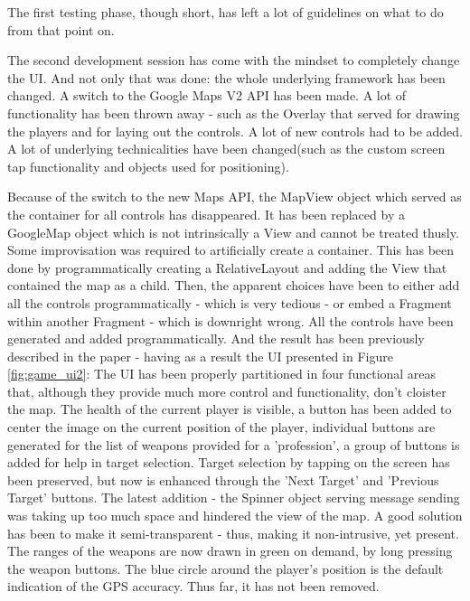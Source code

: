 \documentclass{article}
\begin{document}
The first testing phase, though short, has left a lot of guidelines on what to
do from that point on.\newline

The second development session has come with the mindset to completely change
the UI. And not only that was done: the whole underlying framework has been
changed. A switch to the Google Maps V2 API has been made. A lot of
functionality has been thrown away - such as the Overlay that served for drawing
the players and for laying out the controls. A lot of new controls had to be
added. A lot of underlying technicalities have been changed(such as the custom
screen tap functionality and objects used for positioning).\newline

Because of the switch to the new Maps API, the MapView object which served as
the container for all controls has disappeared. It has been replaced by a
GoogleMap object which is not intrinsically a View and cannot be treated thusly.
Some improvisation was required to artificially create a container. This has
been done by programmatically creating a RelativeLayout and adding the View that
contained the map as a child. Then, the apparent choices have been to either add
all the controls programmatically - which is very tedious - or embed a Fragment
within another Fragment - which is downright wrong. All the controls have been
generated and added programmatically. And the result has been previously
described in the paper - having as a result the UI presented in Figure
\ref{fig:game_ui2}: The UI has been properly partitioned in four functional
areas that, although they provide much more control and functionality, don't
cloister the map. The health of the current player is visible, a button has been
added to center the image on the current position of the player, individual
buttons are generated for the list of weapons provided for a 'profession', a
group of buttons is added for help in target selection. Target selection by
tapping on the screen has been preserved, but now is enhanced through the 'Next
Target' and 'Previous Target' buttons. The latest addition - the Spinner object
serving message sending was taking up too much space and hindered the view of
the map. A good solution has been to make it semi-transparent - thus, making it
non-intrusive, yet present. The ranges of the weapons are now drawn in green on
demand, by long pressing the weapon buttons. The blue circle around the player's
position is the default indication of the GPS accuracy. Thus far, it has not
been removed. \newline
\end{document}
